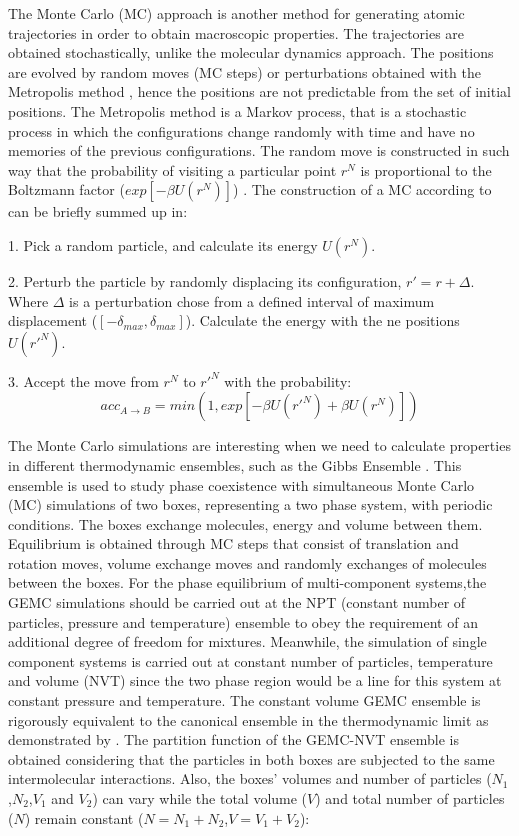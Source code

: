 The Monte Carlo (MC) approach is another method for generating atomic trajectories in order to obtain macroscopic properties. The trajectories are obtained stochastically, unlike the molecular dynamics approach. The positions are evolved by random moves (MC steps) or perturbations obtained with the Metropolis method \cite{1953JChPh..21.1087M}, hence the positions are not predictable from the set of initial positions. The Metropolis method is a Markov process, that is a stochastic process in which the configurations change randomly with time and have no memories of the previous configurations. The random move is constructed in such way that the probability of visiting a particular point $r^{N}$ is proportional to the Boltzmann factor ($exp[-\beta U(r^{N})]$) \cite{frenkel}. The construction of a  MC according to  can be briefly summed up in:

1. Pick a random particle, and calculate its energy $U(r^{N})$.

2. Perturb the particle by randomly displacing  its configuration, $r' = r +\Delta$. Where $\Delta$ is a perturbation chose from a defined interval of maximum displacement ($[- \delta _{max},\delta _{max}]$). Calculate the energy with the ne positions $U(r'^{N})$.

3. Accept the move from $r^{N}$ to $r'^{N}$ with the probability:
\begin{equation}
	acc_{A \rightarrow B} = min(1,exp[-\beta U(r'^{N}) + \beta U(r^{N}) ])
\end{equation}

The  Monte Carlo simulations are interesting when we need to calculate properties in different thermodynamic ensembles, such as the Gibbs Ensemble \cite{papa1987}. This ensemble  is used to study phase coexistence with simultaneous Monte Carlo (MC) simulations of two boxes,  representing a two phase system, with periodic conditions. The boxes exchange molecules, energy and volume between them. Equilibrium is obtained through MC steps that consist of translation and rotation moves, volume exchange moves and randomly exchanges of molecules between the boxes. For the phase equilibrium of multi-component systems,the GEMC simulations should be carried out at the NPT (constant number of particles, pressure and temperature) ensemble to obey the requirement of an additional degree of freedom for mixtures. Meanwhile, the simulation of single component systems is carried out at constant number of particles, temperature and volume (NVT) since the two phase region would be a line for this system at constant pressure and temperature. The constant volume GEMC ensemble is rigorously equivalent to the canonical ensemble in the thermodynamic limit as demonstrated by . The partition function of the GEMC-NVT ensemble is obtained considering that the particles in both boxes are subjected to the same intermolecular interactions. Also, the boxes’ volumes and number of particles ($N_{1}$,$N_{2}$,$V_{1}$ and $V_{2}$) can vary while the total volume ($V$) and total number of particles ($N$) remain constant ($N = N_{1} + N_{2}$,$V = V_{1} + V_{2}$):

